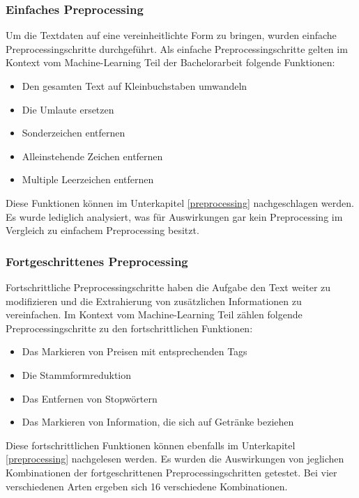 \subsubsection{Einfaches Preprocessing}
Um die Textdaten auf eine vereinheitlichte Form zu bringen, wurden einfache Preprocessingschritte durchgeführt.
Als einfache Preprocessingschritte gelten im Kontext vom Machine-Learning Teil der Bachelorarbeit folgende Funktionen:
\begin{itemize}
\item Den gesamten Text auf Kleinbuchstaben umwandeln
\item Die Umlaute ersetzen
\item Sonderzeichen entfernen
\item Alleinstehende Zeichen entfernen
\item Multiple Leerzeichen entfernen
\end{itemize}
Diese Funktionen können im Unterkapitel \ref{preprocessing} nachgeschlagen werden.
Es wurde lediglich analysiert, was für Auswirkungen gar kein Preprocessing im Vergleich zu einfachem Preprocessing besitzt.
\subsubsection{Fortgeschrittenes Preprocessing}
Fortschrittliche Preprocessingschritte haben die Aufgabe den Text weiter zu modifizieren und die Extrahierung von zusätzlichen Informationen zu vereinfachen.
Im Kontext vom Machine-Learning Teil zählen folgende Preprocessingschritte zu den fortschrittlichen Funktionen:
\begin{itemize}
	\item Das Markieren von Preisen mit entsprechenden Tags
	\item Die Stammformreduktion
	\item Das Entfernen von Stopwörtern
	\item Das Markieren von Information, die sich auf Getränke beziehen
\end{itemize}
Diese fortschrittlichen Funktionen können ebenfalls im Unterkapitel \ref{preprocessing} nachgelesen werden.
Es wurden die Auswirkungen von jeglichen Kombinationen der fortgeschrittenen Preprocessingschritten getestet.
Bei vier verschiedenen Arten ergeben sich 16 verschiedene Kombinationen.
